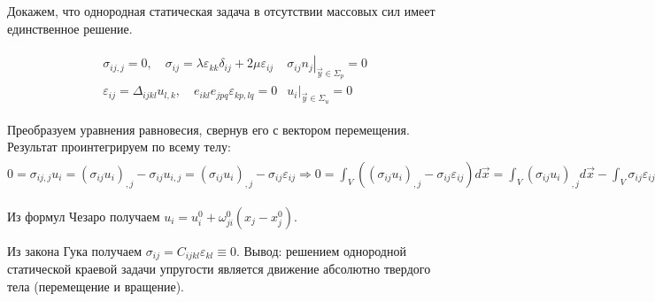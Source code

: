 Докажем, что однородная статическая задача в отсутствии массовых сил имеет единственное решение.


$$
\begin{aligned}
& \begin{array}{ccc}
\sigma_{i j, j}=0, \quad \sigma_{i j}=\lambda \varepsilon_{k k} \delta_{i j}+2 \mu \varepsilon_{i j} & \left.\sigma_{i j} n_j\right|_{\vec{y} \in \Sigma_p}=0 \\
\varepsilon_{i j}=\Delta_{i j k l} u_{l, k}, \quad e_{i k l} e_{j p q} \varepsilon_{k p, l q}=0 & \left.u_i\right|_{\vec{y} \in \Sigma_u}=0
\end{array} 
\end{aligned}$$

Преобразуем уравнения равновесия, свернув его с вектором перемещения. Результат проинтегрируем по всему телу: 
$ 
\displaystyle
0=\sigma_{i j, j} u_i=\left(\sigma_{i j} u_i\right)_{, j}-\sigma_{i j} u_{i, j}=\left(\sigma_{i j} u_i\right)_{, j}-\sigma_{i j} \varepsilon_{i j} \Rightarrow 0=\int_V\left(\left(\sigma_{i j} u_i\right)_{, j}-\sigma_{i j} \varepsilon_{i j}\right) d \vec{x}=\int_V\left(\sigma_{i j} u_i\right)_{, j} d \vec{x}-\int_V \sigma_{i j} \varepsilon_{i j} d \vec{x}=\int_{\partial V} \sigma_{i j} u_i n_j d \Sigma-\int_V \sigma_{i j} \varepsilon_{i j} d \vec{x}=\int_{\Sigma_p} \sigma_{i j} u_i n_j d \Sigma+ \int_{\Sigma_u} \sigma_{i j} u_i n_j d \Sigma- \int_V \sigma_{i j} \varepsilon_{i j} d \vec{x}=\int_{\Sigma_p} P_i^0 u_i d \Sigma+\int_{\Sigma_u} \sigma_{i j} n_j u_i d \Sigma-\int_V \sigma_{i j} \varepsilon_{i j} d \vec{x}=-\int_V \sigma_{i j} \varepsilon_{i j} d \vec{x} \Rightarrow  \int_V \sigma_{i j} \varepsilon_{i j} d \vec{x}=\int_V\left(K \theta^2+G \Gamma^2\right) d \vec{x}=0 \Rightarrow\left\{\begin{array}{l}
\theta=0 \Rightarrow \varepsilon_{i j}=e_{i j} \\
\Gamma=0 \Rightarrow e_{i j} \equiv 0
\end{array} \Rightarrow \varepsilon_{i j} \equiv 0\right.
$

Из формул Чезаро получаем $u_i=u_i^0+\omega_{j i}^0\left(x_j-x_j^0\right)$. 


Из закона Гука получаем $\sigma_{i j}=C_{i j k l} \varepsilon_{k l} \equiv 0$.
Вывод: решением однородной статической краевой задачи упругости является движение абсолютно твердого тела (перемещение и вращение). 



